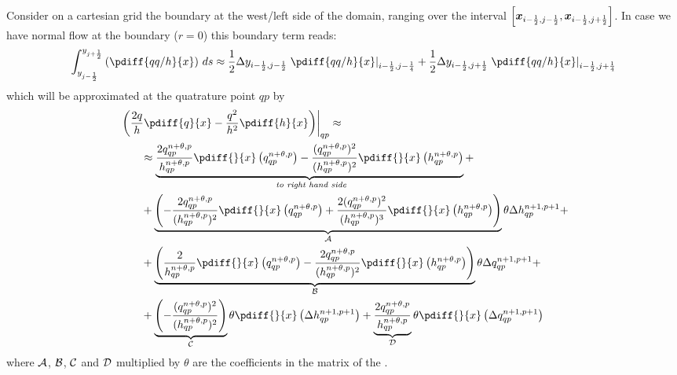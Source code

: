 Consider on a cartesian grid the boundary at the west/left side of the domain, ranging over the interval $\left[ \mbox{\boldmath ${x}$}_{i-\frac{1}{2}, j-\frac{1}{2}}, \mbox{\boldmath ${x}$}_{i-\frac{1}{2}, j+\frac{1}{2}} \right]$.
In case we have normal flow at the boundary ($r=0$) this boundary term reads:
\begin{align}
    \int^{y_{j+\half}}_{y_{j-\half}}\left(
    \pdiff{qq/h}{x}
    \right) \, ds \approx
    \half\Dy_{i-\half, j-\half}\left.\pdiff{qq/h}{x}\right|_{i-\half, j-\quart} + \half \Dy_{i-\half, j+\half}\left.\pdiff{qq/h}{x}\right|_{i-\half, j+\quart}
\end{align}
which will be approximated at the quatrature point $qp$ by
\begin{align}
    & \left. \left( \frac{2q}{h}\pdiff{q}{x} - \frac{q^2}{h^2}\pdiff{h}{x}\right) \right|_{qp}
    \approx
    \\
    & \qquad \approx \underbrace{\frac{2q^{n+\theta, p}_{qp}}{ h^{n+\theta, p}_{qp}} \pdiff{}{x}\left( q^{n+\theta, p}_{qp} \right)
        - \frac{(q^{n+\theta, p}_{qp})^2}{(h^{n+\theta, p}_{qp})^2} \pdiff{}{x} \left( h^{n+\theta, p}_{qp} \right)}_{\textit{ to right hand side}} +
    \nonumber \\
    & \qquad + \underbrace{\left( -\frac{2q^{n+\theta, p}_{qp}}{ (h^{n+\theta, p}_{qp})^2}  \pdiff{}{x} \left( q^{n+\theta,p}_{qp}  \right)
        + \frac{2(q^{n+\theta, p}_{qp})^2}{(h^{n+\theta, p}_{qp})^3} \pdiff{}{x} \left( h^{n+\theta,p} _{qp} \right)
        \right)}_{\cal A} \theta \Delta h^{n+1, p+1}_{qp} +
    \nonumber \\
    & \qquad + \underbrace{\left( \frac{2}{ h^{n+\theta, p}_{qp}} \pdiff{}{x} \left( q^{n+\theta, p}_{qp} \right)
        -  \frac{2q^{n+\theta, p}_{qp}}{(h^{n+\theta, p}_{qp})^2} \pdiff{}{x} \left( h^{n+\theta, p}_{qp} \right)
        \right)}_{\cal B} \theta \Delta q^{n+1, p+1}_{qp} +
    \nonumber \\
    &
    \qquad + \underbrace{\left(- \frac{(q^{n+\theta, p}_{qp})^2}{(h^{n+\theta, p}_{qp})^2} \right)}_{\cal C} \theta \pdiff{}{x} \left( \Delta h^{n+1, p+1}_{qp} \right)
    + \underbrace{\frac{2q^{n+\theta, p}_{qp}}{ h^{n+\theta, p}_{qp}}}_{\cal D} \theta \pdiff{}{x} \left(  \Delta q^{n+1, p+1}_{qp} \right)
\end{align}
where $\cal{A}$, $\cal{B}$, $\cal{C}$ and $\cal{D}$ multiplied by $\theta$ are the coefficients in the matrix of the \deltaformulation.

